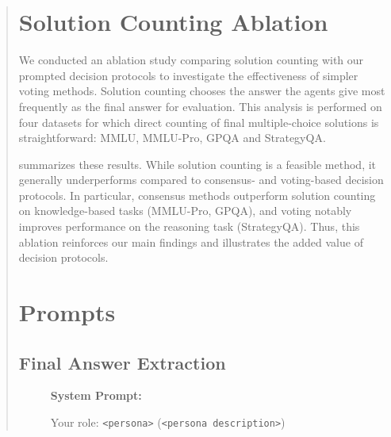 \documentclass[11pt]{article}
\begin{document}
\begin{abstract}
\section{Solution Counting Ablation}
\label{sec:answer-counting-ablation}

We conducted an ablation study comparing solution counting with our prompted decision protocols to investigate the effectiveness of simpler voting methods.
Solution counting chooses the answer the agents give most frequently as the final answer for evaluation.
This analysis is performed on four datasets for which direct counting of final multiple-choice solutions is straightforward: MMLU, MMLU-Pro, GPQA and StrategyQA.

 summarizes these results. While solution counting is a feasible method, it generally underperforms compared to consensus- and voting-based decision protocols. In particular, consensus methods outperform solution counting on knowledge-based tasks (MMLU-Pro, GPQA), and voting notably improves performance on the reasoning task (StrategyQA). Thus, this ablation reinforces our main findings and illustrates the added value of decision protocols.

\clearpage




\section{Prompts}
\label{sec:app_prompts}
\subsection{Final Answer Extraction}
\label{sec:app_final_answer_prompt}
\medskip
\begin{figure}[H]
    \centering
    \begin{combinedprompt}
    \textbf{System Prompt:} \\
    \begingroup
    \colorbox{systemcolor}{\parbox{\dimexpr\linewidth-2\fboxsep\relax}{
    Your role: \texttt{<persona>} (\texttt{<persona description>})
    }}
    \endgroup

    \vspace{0.4em} %


\end{combinedprompt}
\end{figure}
\end{abstract}
\end{document}
